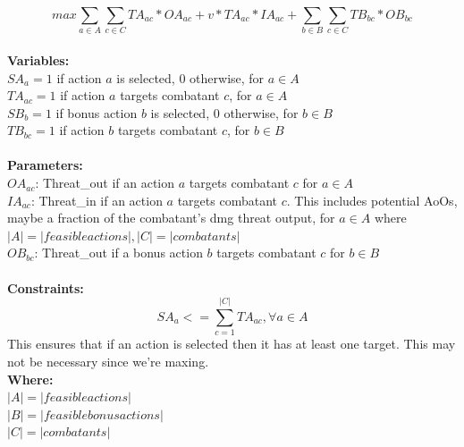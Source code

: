 \documentclass[11pt]{article}
\begin{document}
\[max \sum_{a\in A}\sum_{c\in C} TA_{ac}*OA_{ac} + v*TA_{ac}*IA_{ac}+\sum_{b\in B}\sum_{c\in C}TB_{bc}*OB_{bc}\]
\\
\textbf{Variables:}\\
$SA_{a} = 1$ if action $a$ is selected, $0$ otherwise, for $a \in A$\\
$TA_{ac} = 1$ if action $a$ targets combatant $c$, for $a \in A$\\
$SB_{b} = 1$ if bonus action $b$ is selected, $0$ otherwise, for $b \in B$\\
$TB_{bc} = 1$ if action $b$ targets combatant $c$, for $b \in B$\\
\\
\textbf{Parameters:}\\
$OA_{ac}$:	Threat\_out if an action $a$ targets combatant $c$ for $a \in A$\\
$IA_{ac}$:	Threat\_in if an action $a$ targets combatant $c$.  This includes potential AoOs, maybe a fraction of the combatant's dmg threat output, for $a \in A$ where $|A| = |feasible actions|, |C| = |combatants|$\\
$OB_{bc}$:	Threat\_out if a bonus action $b$ targets combatant $c$ for $b \in B$\\
\\
\textbf{Constraints:}\\
\[SA_a <= \sum_{c=1}^{|C|} TA_{ac},\forall a \in A\] This ensures that if an action is selected then it has at least one target. This may not be necessary since we're maxing.
\\
\textbf{Where:}\\
$|A| = |feasible actions|$\\
$|B| = |feasible bonus actions|$\\
$|C| = |combatants|$\\
\end{document}
